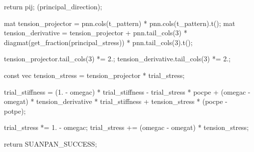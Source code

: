 \begin{cppcode}
{{{			return pij;
		}(principal_direction);

		mat tension_projector = pnn.cols(t_pattern) * pnn.cols(t_pattern).t();
		mat tension_derivative = tension_projector + pnn.tail_cols(3) * diagmat(get_fraction(principal_stress)) * pnn.tail_cols(3).t();

		tension_projector.tail_cols(3) *= 2.;
		tension_derivative.tail_cols(3) *= 2.;

		const vec tension_stress = tension_projector * trial_stress;

		trial_stiffness = (1. - omegac) * trial_stiffness - trial_stress * pocpe + (omegac - omegat) * tension_derivative * trial_stiffness + tension_stress * (pocpe - potpe);

		trial_stress *= 1. - omegac;
		trial_stress += (omegac - omegat) * tension_stress;
	}

	return SUANPAN_SUCCESS;
}
\end{cppcode}

